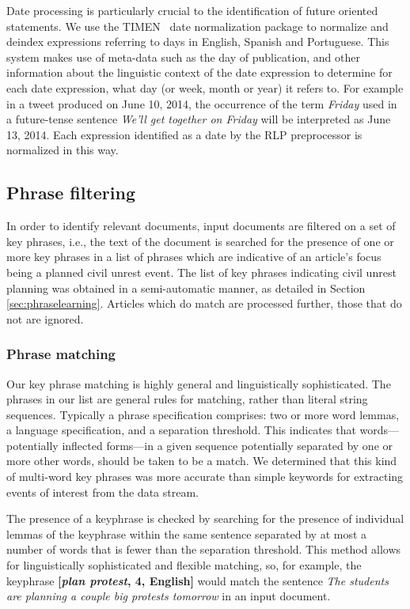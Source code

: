 \documentclass[letterpaper]{article}
\begin{document}
Date processing is particularly crucial to the identification of
future oriented statements. We use the TIMEN~\cite{LlorensDGS12} date
normalization package to normalize and deindex expressions referring
to days in English, Spanish and Portuguese. This system makes use of
meta-data such as the day of publication, and other information about
the linguistic context of the date expression to determine for each
date expression, what day (or week, month or year) it refers to.  For
example in a tweet produced on June 10, 2014, the occurrence of the
term {\em Friday} used in a future-tense sentence {\em We'll get
  together on Friday} will be interpreted as June 13, 2014.  Each
expression identified as a date by the RLP preprocessor is normalized
in this way.

\vspace{-0.5em}
\subsection{Phrase filtering}
In order to identify relevant documents, input documents are filtered on a set of key phrases, i.e.,
the text of the document is searched for the presence of one or
more key phrases in a list of phrases which are indicative of an article's focus being
a planned civil unrest event.  
The list of key phrases indicating civil unrest planning was obtained
in a semi-automatic manner, as detailed in Section \ref{sec:phraselearning}.
Articles which do match are processed further, those that do not are ignored.

\subsubsection{Phrase matching}
Our key phrase matching is highly general and linguistically
sophisticated.  The phrases in our list are general rules for
matching, rather than literal string sequences. Typically a phrase
specification comprises: two or more word lemmas, a language
specification, and a separation threshold. This indicates that words---potentially inflected forms---in 
a given sequence potentially separated by one or more other words, should be taken to be a
match. We determined that this kind of
multi-word key phrases was more accurate than simple keywords for
extracting events of interest from the data stream.

The presence of a keyphrase is checked by searching for the presence of
individual lemmas of the keyphrase within the same sentence separated
by at most a number of words that is fewer than the separation threshold.  
This method allows for linguistically sophisticated and flexible matching, so, for example,
the keyphrase {\bf [{\em plan protest}, 4, English]} would match the sentence
{\em The students are planning a couple big protests tomorrow} in an input document.
\end{document}
